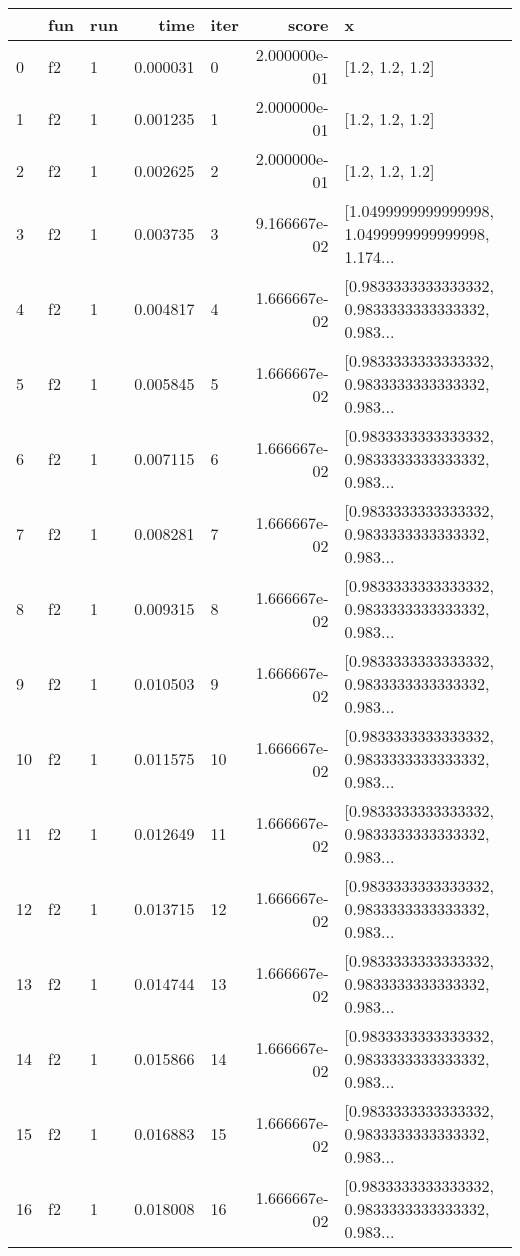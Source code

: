 \begin{tabular}{lllrlrl}
\toprule
{} & fun & run &      time & iter &         score &                                                  x \\
\midrule
0   &  f2 &   1 &  0.000031 &    0 &  2.000000e-01 &                                    [1.2, 1.2, 1.2] \\
1   &  f2 &   1 &  0.001235 &    1 &  2.000000e-01 &                                    [1.2, 1.2, 1.2] \\
2   &  f2 &   1 &  0.002625 &    2 &  2.000000e-01 &                                    [1.2, 1.2, 1.2] \\
3   &  f2 &   1 &  0.003735 &    3 &  9.166667e-02 &  [1.0499999999999998, 1.0499999999999998, 1.174... \\
4   &  f2 &   1 &  0.004817 &    4 &  1.666667e-02 &  [0.9833333333333332, 0.9833333333333332, 0.983... \\
5   &  f2 &   1 &  0.005845 &    5 &  1.666667e-02 &  [0.9833333333333332, 0.9833333333333332, 0.983... \\
6   &  f2 &   1 &  0.007115 &    6 &  1.666667e-02 &  [0.9833333333333332, 0.9833333333333332, 0.983... \\
7   &  f2 &   1 &  0.008281 &    7 &  1.666667e-02 &  [0.9833333333333332, 0.9833333333333332, 0.983... \\
8   &  f2 &   1 &  0.009315 &    8 &  1.666667e-02 &  [0.9833333333333332, 0.9833333333333332, 0.983... \\
9   &  f2 &   1 &  0.010503 &    9 &  1.666667e-02 &  [0.9833333333333332, 0.9833333333333332, 0.983... \\
10  &  f2 &   1 &  0.011575 &   10 &  1.666667e-02 &  [0.9833333333333332, 0.9833333333333332, 0.983... \\
11  &  f2 &   1 &  0.012649 &   11 &  1.666667e-02 &  [0.9833333333333332, 0.9833333333333332, 0.983... \\
12  &  f2 &   1 &  0.013715 &   12 &  1.666667e-02 &  [0.9833333333333332, 0.9833333333333332, 0.983... \\
13  &  f2 &   1 &  0.014744 &   13 &  1.666667e-02 &  [0.9833333333333332, 0.9833333333333332, 0.983... \\
14  &  f2 &   1 &  0.015866 &   14 &  1.666667e-02 &  [0.9833333333333332, 0.9833333333333332, 0.983... \\
15  &  f2 &   1 &  0.016883 &   15 &  1.666667e-02 &  [0.9833333333333332, 0.9833333333333332, 0.983... \\
16  &  f2 &   1 &  0.018008 &   16 &  1.666667e-02 &  [0.9833333333333332, 0.9833333333333332, 0.983... \\

\end{tabular}
